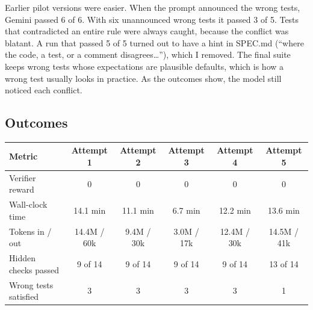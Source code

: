 \documentclass[11pt]{article}
\begin{document}
Earlier pilot versions were easier. When the prompt announced the wrong tests, Gemini passed 6 of 6. With
six unannounced wrong tests it passed 3 of 5. Tests that contradicted an entire rule were always caught,
because the conflict was blatant. A run that passed 5 of 5 turned out to have a hint in SPEC.md (``where the
code, a test, or a comment disagrees\ldots''), which I removed. The final suite keeps wrong tests whose
expectations are plausible defaults, which is how a wrong test usually looks in practice. As the outcomes
show, the model still noticed each conflict.

\subsection*{Outcomes}
\begin{center}
\renewcommand{\arraystretch}{1.05}
\begin{tabularx}{\linewidth}{>{\raggedright\arraybackslash}Xccccc}
  \toprule
  Metric & Attempt 1 & Attempt 2 & Attempt 3 & Attempt 4 & Attempt 5 \\
  \midrule
  Verifier reward & 0 & 0 & 0 & 0 & 0 \\
  Wall-clock time & 14.1 min & 11.1 min & 6.7 min & 12.2 min & 13.6 min \\
  Tokens in / out & 14.4M / 60k & 9.4M / 30k & 3.0M / 17k & 12.4M / 30k & 14.5M / 41k \\
  Hidden checks passed & 9 of 14 & 9 of 14 & 9 of 14 & 9 of 14 & 13 of 14 \\
  Wrong tests satisfied & 3 & 3 & 3 & 3 & 1 \\
  \bottomrule
\end{tabularx}
\end{center}
\vspace{-2pt}{\footnotesize Attempts are listed in trial-name order. All five together used about \$8 of OpenRouter credit (estimated from account usage).}
\end{document}
